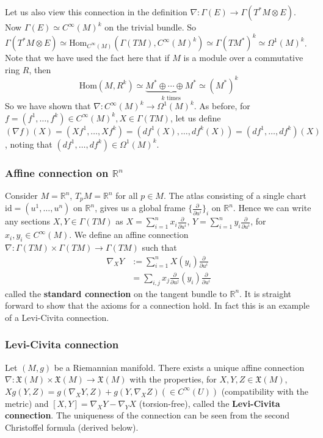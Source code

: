 \documentclass[a4paper]{article}
\theoremstyle{definition} \newtheorem*{definition}{Definition}
\theoremstyle{definition} \newtheorem*{definitions}{Definitions}
\theoremstyle{plain} \newtheorem{theorem}{Theorem}[section]
\theoremstyle{plain} \newtheorem{proposition}[theorem]{Proposition}
\theoremstyle{plain} \newtheorem{corollary}[theorem]{Corollary}
\theoremstyle{plain} \newtheorem{lemma}[theorem]{Lemma}
\theoremstyle{plain} \newtheorem{example}[theorem]{Example}
\newcommand{\defn}[1]{\textbf{#1}}
\newcommand{\realnos}{\mathbb{R}}
\newcommand{\Hom}{\text{Hom}}
\newcommand{\smooth}{C^\infty}
\begin{document}
Let us also view this connection in the definition $\nabla:\Gamma(E)\to \Gamma(T^*M\otimes E)$. Now $\Gamma(E)\simeq \smooth(M)^k$ on the trivial bundle. So  $\Gamma(T^*M\otimes E)\simeq \Hom_{\smooth(M)}(\Gamma(TM), \smooth(M)^k)\simeq \Gamma(TM^*)^k \simeq \Omega^1(M)^k$. Note that we have used the fact here that if $M$ is a module over a commutative ring $R$, then 
$$\Hom(M, R^k)\simeq \underbrace{M^*\oplus \cdots \oplus M^*}_{k \text{ times}} \simeq (M^*)^{k}$$
So we have shown that $\nabla:\smooth(M)^k\to \Omega^1(M)^k$. As before, for $f=(f^1, \ldots, f^k)\in \smooth(M)^k, X\in \Gamma(TM)$, let us define $(\nabla f)(X)=(Xf^1, \ldots, Xf^k)=(df^1(X), \ldots, df^k(X))=(df^1, \ldots, df^k)(X)$, noting that $(df^1, \ldots, df^k)\in \Omega^1(M)^k$.

\subsubsection{Affine connection on $\realnos^n$}
Consider $M=\realnos^n$, $T_pM=\realnos^n$ for all $p\in M$.
The atlas consisting of a single chart $\text{id}=(u^1, \ldots, u^n)$ on $\realnos^n$, gives us a global frame $\{\frac{\partial}{\partial u^i}\}_i$ on $\realnos^n$. Hence we can write any sections $X, Y\in \Gamma(TM)$ as $X=\sum_{i=1}^n x_i \frac{\partial}{\partial u^i}$, $Y=\sum_{i=1}^n y_i \frac{\partial}{\partial u^i}$, for $x_i, y_i \in \smooth(M)$. We define an affine connection $\nabla:\Gamma(TM)\times \Gamma(TM)\to \Gamma(TM)$ such that 
\begin{align*}
\nabla_X Y & := \sum_{i=1}^n X(y_i) \frac{\partial}{\partial u^i} \\
& = \sum_{i, j} x_j\frac{\partial}{\partial u^j}(y_i)\frac{\partial}{\partial u^i}
\end{align*}
called the \defn{standard connection} on the tangent bundle to $\realnos^n$. It is straight forward to show that the axioms for a connection hold. In fact this is an example of a Levi-Civita connection.

\subsubsection{Levi-Civita connection}
Let $(M, g)$ be a Riemannian manifold. There exists a unique affine connection $\nabla:\mathfrak{X}(M)\times \mathfrak{X}(M)\to \mathfrak{X}(M)$ with the properties, for $X,Y,Z\in \mathfrak{X}(M)$,
$Xg(Y,Z)=g(\nabla_XY, Z)+g(Y, \nabla_XZ) (\in C^\infty(U))$ (compatibility with the metric) and $[X,Y]=\nabla_XY-\nabla_YX$ (torsion-free), called the \defn{Levi-Civita connection}. The uniqueness of the connection can be seen from the second Christoffel formula (derived below). 
\end{document}
